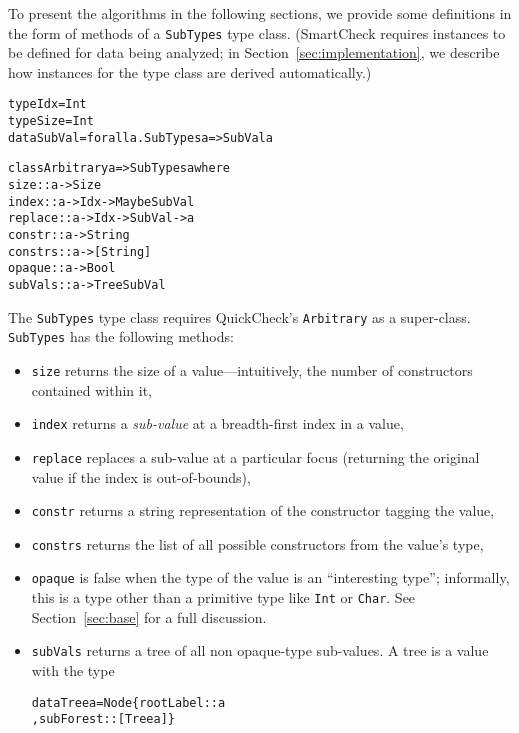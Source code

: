 \documentclass{sigplanconf}
\newenvironment{code}{\begin{alltt}\footnotesize}{\end{alltt}}
\newcommand{\ttp}[1]{\texttt{#1}}
\begin{document}
To present the algorithms in the following sections, we provide some definitions
in the form of methods of a \ttp{SubTypes} type class.  (SmartCheck requires
instances to be defined for data being analyzed; in
Section~\ref{sec:implementation}, we describe how instances for the type class
are derived automatically.)
%
\begin{code}
type Idx    = Int
type Size   = Int
data SubVal = forall a. SubTypes a => SubVal a

class Arbitrary a => SubTypes a where
  size    :: a -> Size
  index   :: a -> Idx -> Maybe SubVal
  replace :: a -> Idx -> SubVal -> a
  constr  :: a -> String
  constrs :: a -> [String]
  opaque  :: a -> Bool
  subVals :: a -> Tree SubVal
\end{code}
%
\noindent
The \ttp{SubTypes} type class requires QuickCheck's \ttp{Arbitrary} as a
super-class.  \ttp{SubTypes} has the following methods:
\begin{itemize}
\item \ttp{size} returns the size of a value---intuitively, the number of
  constructors contained within it,
\item \ttp{index} returns a \emph{sub-value} at a breadth-first index in a
  value,
\item \ttp{replace} replaces a sub-value at a particular focus (returning the
  original value if the index is out-of-bounds),
\item \ttp{constr} returns a string representation of the constructor tagging
  the value,
\item \ttp{constrs} returns the list of all possible constructors from the
  value's type,
\item \ttp{opaque} is false when the type of the value is an ``interesting
  type''; informally, this is a type other than a primitive type like \ttp{Int}
  or \ttp{Char}.  See Section~\ref{sec:base} for a full discussion.
\item \ttp{subVals} returns a tree of all non opaque-type sub-values.  A tree is a
  value with the type
%
  \begin{code}
data Tree a = Node \{ rootLabel :: a
                   , subForest :: [Tree a] \}
  \end{code}
%
\end{itemize}
\end{document}
